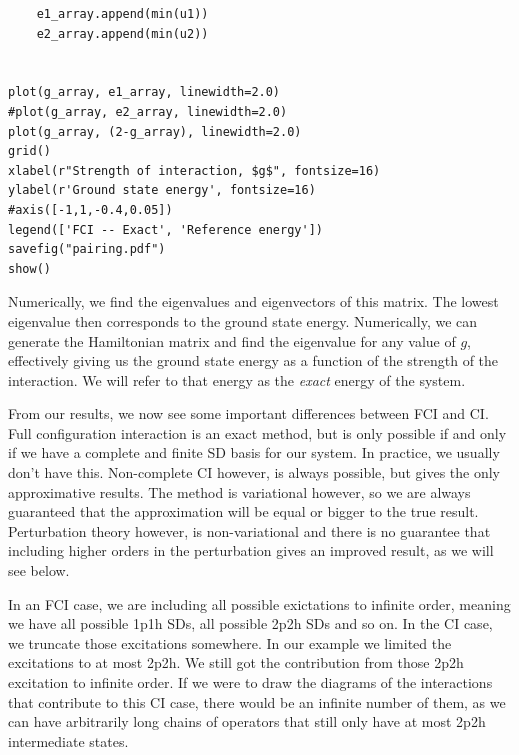 \documentclass[%
twoside,                 %
final,                   %
10pt]{article}
\newenvironment{doconceexercise}{}{}
\begin{document}
\begin{doconceexercise}
\begin{verbatim}
	e1_array.append(min(u1))
	e2_array.append(min(u2))


plot(g_array, e1_array, linewidth=2.0)
#plot(g_array, e2_array, linewidth=2.0)
plot(g_array, (2-g_array), linewidth=2.0)
grid()
xlabel(r"Strength of interaction, $g$", fontsize=16)
ylabel(r'Ground state energy', fontsize=16)
#axis([-1,1,-0.4,0.05])
legend(['FCI -- Exact', 'Reference energy'])
savefig("pairing.pdf")
show()
\end{verbatim}
Numerically, we find the eigenvalues and eigenvectors of this
matrix. The lowest eigenvalue then corresponds to the ground state
energy. Numerically, we can generate the Hamiltonian matrix and find
the eigenvalue for any value of $g$, effectively giving us the ground
state energy as a function of the strength of the interaction. We will
refer to that energy as the \emph{exact} energy of the system. 

From our results, we now see some important differences between FCI
and CI. Full configuration interaction is an exact method, but is only
possible if and only if we have a complete and finite SD basis for our
system. In practice, we usually don't have this. Non-complete
CI however, is always possible, but gives the only  approximative
results. The method is variational however, so we are always
guaranteed that the approximation will be equal or bigger to the true
result. 
Perturbation theory however, is non-variational and there is no guarantee that including higher orders in the 
perturbation gives an improved result, as we will see below.

In an FCI case, we are including all possible exictations to infinite
order, meaning we have all possible 1p1h SDs, all possible 2p2h SDs
and so on. In the CI case, we truncate those excitations somewhere. In
our example we limited the excitations to at most 2p2h. We still got
the contribution from those 2p2h excitation to infinite order. If we
were to draw the diagrams of the interactions that contribute to this
CI case, there would be an infinite number of them, as we can have
arbitrarily long chains of operators that still only have at most 2p2h
intermediate states.



\end{doconceexercise}
\end{document}
